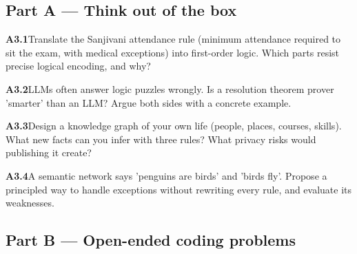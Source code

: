 \documentclass[11pt]{article}
\begin{document}
\subsection*{\color{navy}Part A --- Think out of the box}
\begin{tcolorbox}[enhanced,colback=goldL,colframe=gold!80!black,arc=2mm,boxrule=0.8pt,left=3mm]
\textbf{\color{navy}A3.1}\quad Translate the Sanjivani attendance rule (minimum attendance required to sit the exam, with medical exceptions) into first-order logic. Which parts resist precise logical encoding, and why?\hfill{}
\end{tcolorbox}
\begin{tcolorbox}[enhanced,colback=goldL,colframe=gold!80!black,arc=2mm,boxrule=0.8pt,left=3mm]
\textbf{\color{navy}A3.2}\quad LLMs often answer logic puzzles wrongly. Is a resolution theorem prover 'smarter' than an LLM? Argue both sides with a concrete example.\hfill{}
\end{tcolorbox}
\begin{tcolorbox}[enhanced,colback=goldL,colframe=gold!80!black,arc=2mm,boxrule=0.8pt,left=3mm]
\textbf{\color{navy}A3.3}\quad Design a knowledge graph of your own life (people, places, courses, skills). What new facts can you infer with three rules? What privacy risks would publishing it create?\hfill{}
\end{tcolorbox}
\begin{tcolorbox}[enhanced,colback=goldL,colframe=gold!80!black,arc=2mm,boxrule=0.8pt,left=3mm]
\textbf{\color{navy}A3.4}\quad A semantic network says 'penguins are birds' and 'birds fly'. Propose a principled way to handle exceptions without rewriting every rule, and evaluate its weaknesses.\hfill{}
\end{tcolorbox}
\subsection*{\color{navy}Part B --- Open-ended coding problems}
\end{document}
